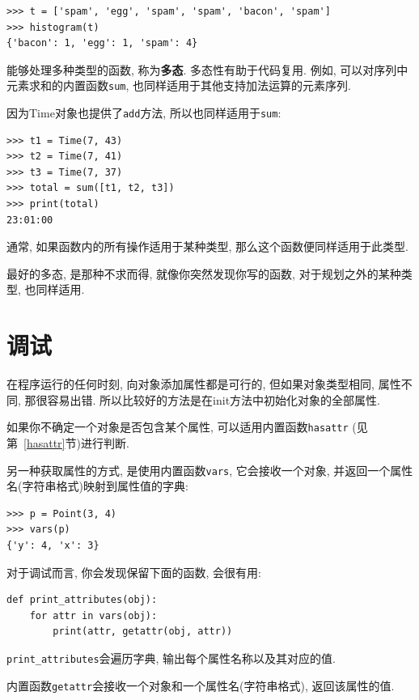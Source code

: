 \documentclass[10pt]{book}
\begin{document}
\begin{verbatim}
>>> t = ['spam', 'egg', 'spam', 'spam', 'bacon', 'spam']
>>> histogram(t)
{'bacon': 1, 'egg': 1, 'spam': 4}
\end{verbatim}
%
能够处理多种类型的函数, 称为{\bf 多态}. 
多态性有助于代码复用. 
例如, 可以对序列中元素求和的内置函数{\tt sum}, 
也同样适用于其他支持加法运算的元素序列. 

因为Time对象也提供了{\tt add}方法, 所以也同样适用于{\tt sum}:

\begin{verbatim}
>>> t1 = Time(7, 43)
>>> t2 = Time(7, 41)
>>> t3 = Time(7, 37)
>>> total = sum([t1, t2, t3])
>>> print(total)
23:01:00
\end{verbatim}
%
通常, 如果函数内的所有操作适用于某种类型, 那么这个函数便同样适用于此类型. 

最好的多态, 是那种不求而得, 
就像你突然发现你写的函数, 对于规划之外的某种类型, 也同样适用. 


\section{调试}

在程序运行的任何时刻, 向对象添加属性都是可行的, 
但如果对象类型相同, 属性不同, 那很容易出错. 
所以比较好的方法是在init方法中初始化对象的全部属性. 

如果你不确定一个对象是否包含某个属性, 可以适用内置函数{\tt hasattr}
 (见第~\ref{hasattr}节)进行判断. 

另一种获取属性的方式, 是使用内置函数{\tt vars},
它会接收一个对象, 并返回一个属性名(字符串格式)映射到属性值的字典:

\begin{verbatim}
>>> p = Point(3, 4)
>>> vars(p)
{'y': 4, 'x': 3}
\end{verbatim}
%

对于调试而言, 你会发现保留下面的函数, 会很有用:

\begin{verbatim}
def print_attributes(obj):
    for attr in vars(obj):
        print(attr, getattr(obj, attr))
\end{verbatim}
%
\verb"print_attributes"会遍历字典, 输出每个属性名称以及其对应的值. 

内置函数{\tt getattr}会接收一个对象和一个属性名(字符串格式), 返回该属性的值. 
\end{document}
